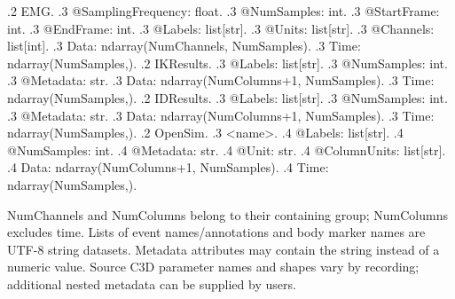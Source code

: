 \documentclass{article}
\newcommand{\added}[1]{\textcolor{added}{#1}}
\newcommand{\code}[1]{\texttt{\detokenize{#1}}}
\begin{document}
{.2 \added{EMG}.
.3 \added{@SamplingFrequency: float}.
.3 \added{@NumSamples: int}.
.3 \added{@StartFrame: int}.
.3 \added{@EndFrame: int}.
.3 \added{@Labels: list[str]}.
.3 \added{@Units: list[str]}.
.3 \added{@Channels: list[int]}.
.3 \added{Data: ndarray(NumChannels, NumSamples)}.
.3 \added{Time: ndarray(NumSamples,)}.
.2 \added{IKResults}.
.3 \added{@Labels: list[str]}.
.3 \added{@NumSamples: int}.
.3 \added{@Metadata: str}.
.3 \added{Data: ndarray(NumColumns+1, NumSamples)}.
.3 \added{Time: ndarray(NumSamples,)}.
.2 \added{IDResults}.
.3 \added{@Labels: list[str]}.
.3 \added{@NumSamples: int}.
.3 \added{@Metadata: str}.
.3 \added{Data: ndarray(NumColumns+1, NumSamples)}.
.3 \added{Time: ndarray(NumSamples,)}.
.2 \added{OpenSim}.
.3 \added{<name>}.
.4 \added{@Labels: list[str]}.
.4 \added{@NumSamples: int}.
.4 \added{@Metadata: str}.
.4 \added{@Unit: str}.
.4 \added{@ColumnUnits: list[str]}.
.4 \added{Data: ndarray(NumColumns+1, NumSamples)}.
.4 \added{Time: ndarray(NumSamples,)}.
}

NumChannels and NumColumns belong to their containing group; NumColumns
excludes time. Lists of event names/annotations and body marker names are
UTF-8 string datasets. Metadata attributes may contain the string
\code{Unknown} instead of a numeric value. Source C3D parameter names and
shapes vary by recording; additional nested metadata can be supplied by users.
\end{document}
